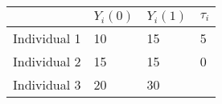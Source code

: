 \documentclass[]{article}
\begin{document}
\begin{longtable}[]{@{}llll@{}}
\toprule
\begin{minipage}[b]{0.20\columnwidth}\raggedright
\strut
\end{minipage} & \begin{minipage}[b]{0.16\columnwidth}\raggedright
\(Y_{i}(0)\)\strut
\end{minipage} & \begin{minipage}[b]{0.16\columnwidth}\raggedright
\(Y_{i}(1)\)\strut
\end{minipage} & \begin{minipage}[b]{0.16\columnwidth}\raggedright
\(\tau_i\)\strut
\end{minipage}\tabularnewline
\midrule
\endhead
\begin{minipage}[t]{0.20\columnwidth}\raggedright
Individual 1\strut
\end{minipage} & \begin{minipage}[t]{0.16\columnwidth}\raggedright
10\strut
\end{minipage} & \begin{minipage}[t]{0.16\columnwidth}\raggedright
15\strut
\end{minipage} & \begin{minipage}[t]{0.16\columnwidth}\raggedright
5\strut
\end{minipage}\tabularnewline
\begin{minipage}[t]{0.20\columnwidth}\raggedright
Individual 2\strut
\end{minipage} & \begin{minipage}[t]{0.16\columnwidth}\raggedright
15\strut
\end{minipage} & \begin{minipage}[t]{0.16\columnwidth}\raggedright
15\strut
\end{minipage} & \begin{minipage}[t]{0.16\columnwidth}\raggedright
0\strut
\end{minipage}\tabularnewline
\begin{minipage}[t]{0.20\columnwidth}\raggedright
Individual 3\strut
\end{minipage} & \begin{minipage}[t]{0.16\columnwidth}\raggedright
20\strut
\end{minipage} & \begin{minipage}[t]{0.16\columnwidth}\raggedright
30\strut
\end{minipage} & \begin{minipage}[t]{0.16\columnwidth}\raggedright

\end{minipage}
\end{longtable}
\end{document}
